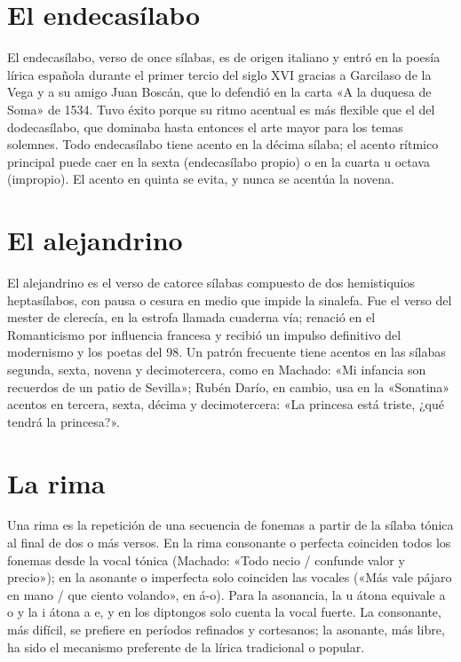 \documentclass{book}
\begin{document}

\section{El endecasílabo}

El endecasílabo, verso de once sílabas, es de origen italiano y entró en la poesía lírica española durante el primer tercio del siglo XVI gracias a Garcilaso de la Vega y a su amigo Juan Boscán, que lo defendió en la carta «A la duquesa de Soma» de 1534. Tuvo éxito porque su ritmo acentual es más flexible que el del dodecasílabo, que dominaba hasta entonces el arte mayor para los temas solemnes. Todo endecasílabo tiene acento en la décima sílaba; el acento rítmico principal puede caer en la sexta (endecasílabo propio) o en la cuarta u octava (impropio). El acento en quinta se evita, y nunca se acentúa la novena.


\section{El alejandrino}

El alejandrino es el verso de catorce sílabas compuesto de dos hemistiquios heptasílabos, con pausa o cesura en medio que impide la sinalefa. Fue el verso del mester de clerecía, en la estrofa llamada cuaderna vía; renació en el Romanticismo por influencia francesa y recibió un impulso definitivo del modernismo y los poetas del 98. Un patrón frecuente tiene acentos en las sílabas segunda, sexta, novena y decimotercera, como en Machado: «Mi infancia son recuerdos de un patio de Sevilla»; Rubén Darío, en cambio, usa en la «Sonatina» acentos en tercera, sexta, décima y decimotercera: «La princesa está triste, ¿qué tendrá la princesa?».


\section{La rima}

Una rima es la repetición de una secuencia de fonemas a partir de la sílaba tónica al final de dos o más versos. En la rima consonante o perfecta coinciden todos los fonemas desde la vocal tónica (Machado: «Todo necio / confunde valor y precio»); en la asonante o imperfecta solo coinciden las vocales («Más vale pájaro en mano / que ciento volando», en á-o). Para la asonancia, la u átona equivale a o y la i átona a e, y en los diptongos solo cuenta la vocal fuerte. La consonante, más difícil, se prefiere en períodos refinados y cortesanos; la asonante, más libre, ha sido el mecanismo preferente de la lírica tradicional o popular.
\end{document}
